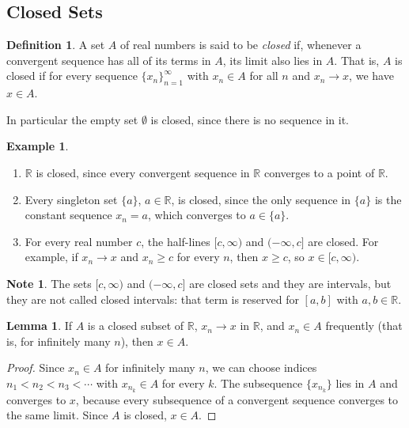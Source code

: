 \documentclass[11pt,a4paper]{article}
\numberwithin{equation}{section}
\theoremstyle{definition}
\newtheorem{defn}[thm]{Definition}
\newtheorem{exa}[thm]{Example}
\newtheorem{lem}[thm]{Lemma}
\newtheorem*{note}{Note}
\begin{document}
\subsection{Closed Sets}

\begin{defn}
A set $A$ of real numbers is said to be \emph{closed} if, whenever a convergent sequence has all of its terms in $A$, its limit also lies in $A$. That is, $A$ is closed if for every sequence $\{ x_n \}^{\infty}_{n = 1}$ with $x_n \in A$ for all $n$ and $x_n \longrightarrow x$, we have $x \in A$.

In particular the empty set $\emptyset$ is closed, since there is no sequence in it.
\end{defn}


\begin{exa}
\begin{enumerate}
\item $\mathbb{R}$ is closed, since every convergent sequence in $\mathbb{R}$ converges to a point of $\mathbb{R}$.
\item Every singleton set $\{a\}$, $a\in \mathbb{R}$, is closed, since the only sequence in $\{a\}$ is the constant sequence $x_n = a$, which converges to $a\in \{a\}$.
\item For every real number $c$, the half-lines $[c, \infty)$ and $(-\infty,c]$ are closed. For example, if $x_n \longrightarrow x$ and $x_n \geq c$ for every $n$, then $x\geq c$, so $x\in [c,\infty)$.
\end{enumerate}

\begin{note}
The sets $[c,\infty)$ and $(-\infty, c]$ are closed sets and they are intervals, but they are not called closed intervals: that term is reserved for $[a,b]$ with $a,b\in \mathbb{R}$.
\end{note}
\end{exa}


\begin{lem}\label{lem:frequently}
If $A$ is a closed subset of $\mathbb{R}$, $x_n \longrightarrow x$ in $\mathbb{R}$, and $x_n \in A$ frequently (that is, for infinitely many $n$), then $x\in A$.
\end{lem}

\begin{proof}
Since $x_n\in A$ for infinitely many $n$, we can choose indices $n_1<n_2<n_3<\cdots$ with $x_{n_k}\in A$ for every $k$. The subsequence $\{x_{n_k}\}$ lies in $A$ and converges to $x$, because every subsequence of a convergent sequence converges to the same limit. Since $A$ is closed, $x\in A$.
\end{proof}
\end{document}

